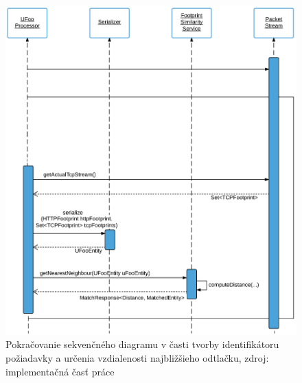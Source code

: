 \documentclass[
  digital, %
  oneside, %
  table,   %
  lof,     %
  nolot,   %
  nocover
]{fithesis3}
\begin{document}
\begin{figure}[H]
  \centering
    \includegraphics[width=1.1\textwidth]{images/footprint-impl-flow-2.png}
  \caption{Pokračovanie sekvenčného diagramu v časti tvorby identifikátoru požiadavky a
  určenia vzdialenosti najbližšieho odtlačku, zdroj: implementačná časť práce}
\end{figure}

\end{document}
